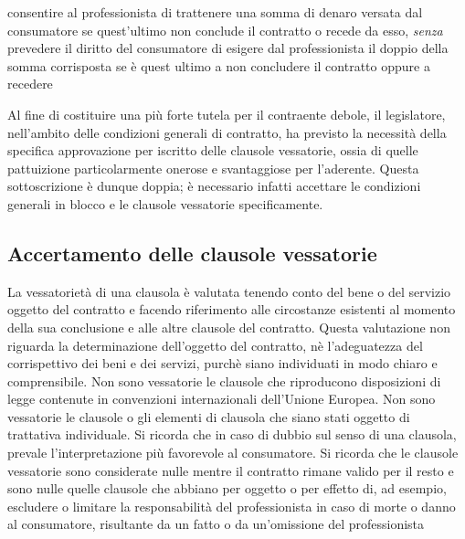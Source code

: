 consentire al professionista di trattenere una somma di denaro versata dal consumatore se quest'ultimo non conclude
il contratto o recede da esso, \emph{senza} prevedere il diritto del consumatore di esigere dal professionista
il doppio della somma corrisposta se è quest ultimo a non concludere il contratto oppure a recedere \newline \newline

Al fine di costituire una più forte tutela per il contraente debole, il legislatore, nell'ambito
delle condizioni generali di contratto, ha previsto la necessità della specifica approvazione per iscritto delle clausole
vessatorie, ossia di quelle pattuizione particolarmente onerose e svantaggiose per l'aderente. Questa sottoscrizione
è dunque doppia; è necessario infatti accettare le condizioni generali in blocco e le clausole vessatorie specificamente.

\subsection{Accertamento delle clausole vessatorie}
La vessatorietà di una clausola è valutata tenendo conto del bene o del servizio oggetto del contratto e facendo riferimento
alle circostanze esistenti al momento della sua conclusione e alle altre clausole del contratto. Questa valutazione non riguarda
la determinazione dell'oggetto del contratto, nè l'adeguatezza del corrispettivo dei beni e dei servizi, purchè siano individuati
in modo chiaro e comprensibile.\newline
Non sono vessatorie le clausole che riproducono disposizioni di legge contenute in convenzioni internazionali dell'Unione Europea.\newline
Non sono vessatorie le clausole o gli elementi di clausola che siano stati oggetto di trattativa individuale.\newline
Si ricorda che in caso di dubbio sul senso di una clausola, prevale l'interpretazione più favorevole al consumatore.\newline\newline
Si ricorda che le clausole vessatorie sono considerate nulle mentre il contratto rimane valido per il resto e sono nulle quelle clausole
che abbiano per oggetto o per effetto di, ad esempio, escludere o limitare la responsabilità del professionista in caso di
morte o danno al consumatore, risultante da un fatto o da un'omissione del professionista

